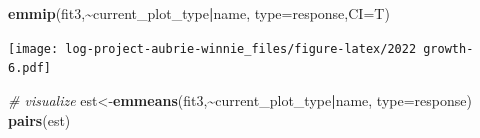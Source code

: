 \documentclass[
]{article}
\newenvironment{Shaded}{\begin{snugshade}}{\end{snugshade}}
\newcommand{\AttributeTok}[1]{\textcolor[rgb]{0.13,0.29,0.53}{#1}}
\newcommand{\CommentTok}[1]{\textcolor[rgb]{0.56,0.35,0.01}{\textit{#1}}}
\newcommand{\FunctionTok}[1]{\textcolor[rgb]{0.13,0.29,0.53}{\textbf{#1}}}
\newcommand{\NormalTok}[1]{#1}
\newcommand{\OtherTok}[1]{\textcolor[rgb]{0.56,0.35,0.01}{#1}}
\newcommand{\SpecialCharTok}[1]{\textcolor[rgb]{0.81,0.36,0.00}{\textbf{#1}}}
\newcommand{\StringTok}[1]{\textcolor[rgb]{0.31,0.60,0.02}{#1}}
\begin{document}
\begin{Shaded}
\begin{Highlighting}[]
\FunctionTok{emmip}\NormalTok{(fit3,}\SpecialCharTok{\textasciitilde{}}\NormalTok{current\_plot\_type}\SpecialCharTok{|}\NormalTok{name, }\AttributeTok{type=}\StringTok{\textquotesingle{}response\textquotesingle{}}\NormalTok{,}\AttributeTok{CI=}\NormalTok{T)}
\end{Highlighting}
\end{Shaded}

\texttt{[image: log-project-aubrie-winnie\_files/figure-latex/2022 growth-6.pdf]}

\begin{Shaded}
\begin{Highlighting}[]
\CommentTok{\# visualize}
\NormalTok{est}\OtherTok{\textless{}{-}}\FunctionTok{emmeans}\NormalTok{(fit3,}\SpecialCharTok{\textasciitilde{}}\NormalTok{current\_plot\_type}\SpecialCharTok{|}\NormalTok{name, }\AttributeTok{type=}\StringTok{\textquotesingle{}response\textquotesingle{}}\NormalTok{)}
\FunctionTok{pairs}\NormalTok{(est)}
\end{Highlighting}
\end{Shaded}
\end{document}
